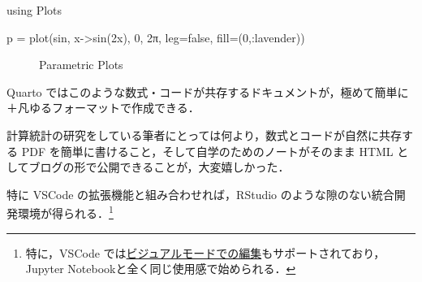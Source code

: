 \documentclass[
]{ltjsarticle}
\newenvironment{Shaded}{\begin{snugshade}}{\end{snugshade}}
\newcommand{\BuiltInTok}[1]{\textcolor[rgb]{0.00,0.23,0.31}{#1}}
\newcommand{\ConstantTok}[1]{\textcolor[rgb]{0.56,0.35,0.01}{#1}}
\newcommand{\FloatTok}[1]{\textcolor[rgb]{0.68,0.00,0.00}{#1}}
\newcommand{\FunctionTok}[1]{\textcolor[rgb]{0.28,0.35,0.67}{#1}}
\newcommand{\ImportTok}[1]{\textcolor[rgb]{0.00,0.46,0.62}{#1}}
\newcommand{\NormalTok}[1]{\textcolor[rgb]{0.00,0.23,0.31}{#1}}
\newcommand{\OperatorTok}[1]{\textcolor[rgb]{0.37,0.37,0.37}{#1}}
\begin{document}
\begin{Shaded}
\begin{Highlighting}[]
\ImportTok{using} \BuiltInTok{Plots}

\NormalTok{p }\OperatorTok{=} \FunctionTok{plot}\NormalTok{(sin, }
     \FunctionTok{x{-}\textgreater{}sin}\NormalTok{(}\FloatTok{2}\NormalTok{x), }
     \FloatTok{0}\NormalTok{, }
     \FloatTok{2}\NormalTok{π, }
\NormalTok{     leg}\OperatorTok{=}\ConstantTok{false}\NormalTok{, }
\NormalTok{     fill}\OperatorTok{=}\NormalTok{(}\FloatTok{0}\NormalTok{,}\OperatorTok{:}\NormalTok{lavender))}
\end{Highlighting}
\end{Shaded}

\begin{figure}[H]


\caption{\label{fig-parametric}Parametric Plots}

\end{figure}%

Quarto
ではこのような数式・コードが共存するドキュメントが，極めて簡単に＋凡ゆるフォーマットで作成できる．

計算統計の研究をしている筆者にとっては何より，数式とコードが自然に共存する
PDF を簡単に書けること，そして自学のためのノートがそのまま HTML
としてブログの形で公開できることが，大変嬉しかった．

特に VSCode の拡張機能と組み合わせれば，RStudio
のような隙のない統合開発環境が得られる．\footnote{特に，VSCode
  では\href{https://quarto.org/docs/visual-editor/vscode/}{ビジュアルモードでの編集}もサポートされており，Jupyter
  Notebookと全く同じ使用感で始められる．}
\end{document}
